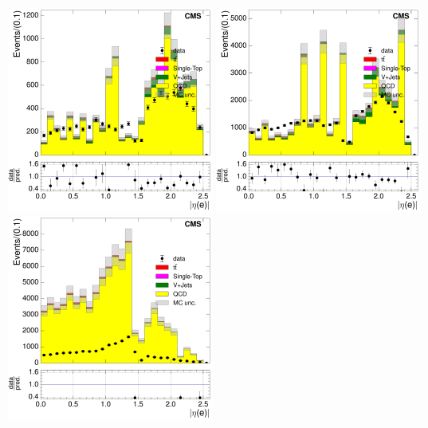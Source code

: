  \begin{figure}[hbtp]
    \centering
      \includegraphics[width=0.48\textwidth]{Chapters/04_Analysis/04b_XSections/images/control_plots/before_fit/7TeV/qcd_plots/QCD_electron_AbsEta_conversion_control_region_0btag_with_ratio}\hfill
      \includegraphics[width=0.48\textwidth]{Chapters/04_Analysis/04b_XSections/images/control_plots/before_fit/8TeV/qcd_plots/QCD_electron_AbsEta_conversion_control_region_0btag_with_ratio}\\
      \includegraphics[width=0.48\textwidth]{Chapters/04_Analysis/04b_XSections/images/control_plots/before_fit/7TeV/qcd_plots/QCD_electron_AbsEta_non_iso_control_region_0btag_with_ratio}\hfill

\end{figure}
